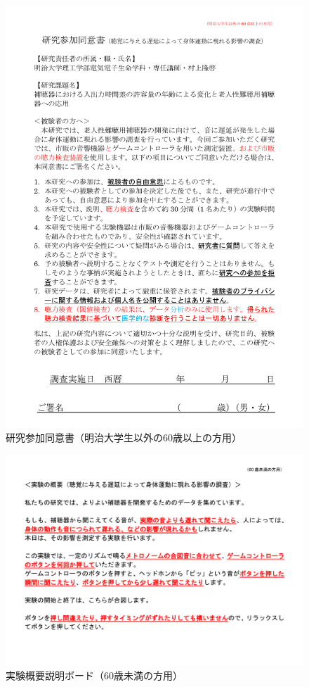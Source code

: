 \begin{figure}[ht]
  \centering
  \includegraphics[scale=0.55]{furoku_A/Douisyo_60NotMeiji.pdf}
  \caption{研究参加同意書（明治大学生以外の60歳以上の方用）}
\end{figure}
\begin{figure}[ht]
  \centering
  \includegraphics[scale=0.4]{furoku_A/Less60_gaiyou.pdf}
  \caption{実験概要説明ボード（60歳未満の方用）}
\end{figure}
